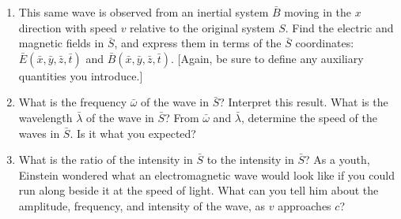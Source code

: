 \documentclass[fleqn]{article}
\begin{document}
\begin{enumerate}
\begin{enumerate}

      \item This same wave is observed from an inertial system $\bar{B}$ moving in the $x$ direction
      with speed $v$ relative to the original system $S$. Find the electric and magnetic
      fields in $\bar{S}$, and express them in terms of the $\bar{S}$ coordinates:  $\bar{E}(\bar{x}, \bar{y}, \bar{z}, \bar{t})$ and
      $\bar{B}(\bar{x}, \bar{y}, \bar{z}, \bar{t})$. [Again, be sure to define any auxiliary quantities you introduce.]


      \item  What is the frequency $\bar{\omega}$ of the wave in $\bar{S}$? Interpret this result. What is the
      wavelength $\bar{\lambda}$ of the wave in $\bar{S}$? From $\bar{\omega}$ and $\bar{\lambda}$, determine the speed of the
      waves in $\bar{S}$. Is it what you expected?


      \item What is the ratio of the intensity in $\bar{S}$ to the intensity in $\bar{S}$? As a youth, Einstein wondered what an 
      electromagnetic wave would look like if you could run along beside it at the speed of light. What can you tell him about the amplitude,
      frequency, and intensity of the wave, as $v$ approaches $c$?


    \end{enumerate}

  \end{enumerate}
\end{document}
